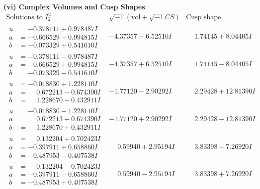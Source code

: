 \documentclass[1p]{elsarticle_modified}
\theoremstyle{definition}
\newcommand{\I}{\sqrt{-1}}
\begin{document}
\newpage\flushleft \textbf{(vi) Complex Volumes and Cusp Shapes}
$$\begin{array}{c|c|c}  
\text{Solutions to }I^u_{2}& \I (\text{vol} + \sqrt{-1}CS) & \text{Cusp shape}\\
 \hline 
\begin{aligned}
u &= -0.378111 + 0.978487 I \\
a &= -0.666529 - 0.994815 I \\
b &= -0.073329 + 0.541610 I\end{aligned}
 & -4.37357 - 6.52510 I & \phantom{-}1.74145 + 8.04405 I \\ \hline\begin{aligned}
u &= -0.378111 - 0.978487 I \\
a &= -0.666529 + 0.994815 I \\
b &= -0.073329 - 0.541610 I\end{aligned}
 & -4.37357 + 6.52510 I & \phantom{-}1.74145 - 8.04405 I \\ \hline\begin{aligned}
u &= -0.018830 + 1.228110 I \\
a &= \phantom{-}0.672213 - 0.674390 I \\
b &= \phantom{-}1.228670 - 0.432911 I\end{aligned}
 & -1.77120 - 2.90292 I & \phantom{-}2.29428 + 12.81390 I \\ \hline\begin{aligned}
u &= -0.018830 - 1.228110 I \\
a &= \phantom{-}0.672213 + 0.674390 I \\
b &= \phantom{-}1.228670 + 0.432911 I\end{aligned}
 & -1.77120 + 2.90292 I & \phantom{-}2.29428 - 12.81390 I \\ \hline\begin{aligned}
u &= \phantom{-}0.132204 + 0.702423 I \\
a &= -0.397911 + 0.658860 I \\
b &= -0.487953 - 0.407538 I\end{aligned}
 & \phantom{-}0.59940 + 2.95194 I & \phantom{-}3.83398 - 7.26920 I \\ \hline\begin{aligned}
u &= \phantom{-}0.132204 - 0.702423 I \\
a &= -0.397911 - 0.658860 I \\
b &= -0.487953 + 0.407538 I\end{aligned}
 & \phantom{-}0.59940 - 2.95194 I & \phantom{-}3.83398 + 7.26920 I \\ \hline\begin{aligned}

\end{aligned}
\end{array}$$
\end{document}
